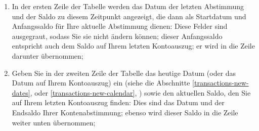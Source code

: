 \begin{enumerate}
	\item In der ersten Zeile der Tabelle werden das Datum der letzten Abstimmung und der Saldo zu diesem Zeitpunkt angezeigt, die dann als Startdatum und Anfangssaldo für Ihre aktuelle Abstimmung dienen: Diese Felder sind ausgegraut, sodass Sie sie nicht ändern können; dieser Anfangssaldo entspricht auch dem Saldo auf Ihrem letzten Kontoauszug; er wird in die Zeile  darunter übernommen;
	\item Geben Sie in der zweiten Zeile der Tabelle das heutige Datum (oder das Datum auf Ihrem Kontoauszug) ein (siehe die Abschnitte \vref{transactions-new-dates},  oder \vref{transactions-new-calendar}, ) sowie den aktuellen Saldo, den Sie auf Ihrem letzten Kontoauszug finden: Dies sind das Datum und der Endsaldo Ihrer Kontenabstimmung; ebenso wird dieser Saldo in die Zeile  weiter unten übernommen;

\end{enumerate}
